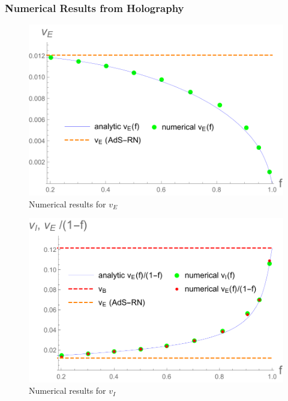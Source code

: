 \documentclass[10pt,aspectratio=169]{beamer}
\begin{document}
\begin{frame}
\frametitle{Numerical Results from Holography}


\begin{minipage}[t]{0.5\linewidth}

\begin{figure}
    \begin{center}
    
        \includegraphics[scale=0.4]{vEvsfholographic}    
    
    \end{center}
    \caption{Numerical results for $v_E$}
    \label{fig:vEFromHolography}
\end{figure}

\end{minipage}\hfill
%
\begin{minipage}[t]{0.5\linewidth}

\begin{figure}
    \begin{center}
    
        \includegraphics[scale=0.4]{vIvsfholographic}    
    
    \end{center}
    \caption{Numerical results for $v_I$}
    \label{fig:vIFromHolography}
\end{figure}

\end{minipage}

\end{frame}
\end{document}
